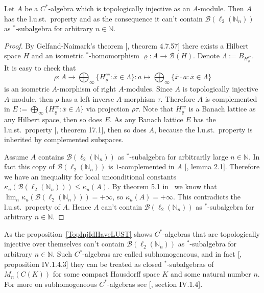 \begin{proposition}\label{TopInjIdHaveLUST} Let $A$ be a $C^*$-algebra which is
topologically injective as an $A$-module. Then $A$ has the l.u.st.\ property and
as the consequence it can't contain  $\mathcal{B}(\ell_2(\mathbb{N}_n))$ as
${}^*$-subalgebra for arbitrary $n\in\mathbb{N}$.
\end{proposition}
\begin{proof} By Gelfand-Naimark's theorem [\cite{HelBanLocConvAlg}, theorem
4.7.57] there exists a Hilbert space $H$ and an isometric ${}^*$-homomorphism
$\varrho:A\to\mathcal{B}(H)$. Denote $\Lambda:=B_{H_\varrho^{cc}}$. It is easy
to check that 
$$
\rho
:A
    \to
\bigoplus\nolimits_\infty \{H_\varrho^{cc}:\overline{x}\in \Lambda \}
:a
    \mapsto 
\bigoplus\nolimits_\infty \{\overline{x}\cdot a:\overline{x}\in \Lambda \}
$$
is an isometric $A$-morphism of right $A$-modules. Since $A$ is topologically
injective $A$-module, then $\rho$ has a left inverse $A$-morphism $\tau$.
Therefore $A$ is complemented in $E:=\bigoplus_\infty
\{H_\varrho^{cc}:\overline{x}\in \Lambda \}$ via projection $\rho\tau$. Note
that $H_{\varrho}^{cc}$ is a Banach lattice as any Hilbert space, then so does
$E$. As any Banach lattice $E$ has the l.u.st.\ property [\cite{DiestAbsSumOps},
theorem 17.1], then so does $A$, because the l.u.st.\ property is inherited by
complemented subspaces.

Assume $A$ contains $\mathcal{B}(\ell_2(\mathbb{N}_n))$ as ${}^*$-subalgebra for
arbitrarily large $n\in\mathbb{N}$. In fact this copy of
$\mathcal{B}(\ell_2(\mathbb{N}_n))$ is $1$-complemented in $A$
[\cite{LauLoyWillisAmnblOfBanAndCStarAlgsOfLCG}, lemma 2.1]. Therefore we have
an inequality for local unconditional constants
$\kappa_u(\mathcal{B}(\ell_2(\mathbb{N}_n)))\leq \kappa_u(A)$. By theorem 5.1
in~\cite{GorLewAbsSmOpAndLocUncondStrct} we know that $\lim_n
\kappa_u(\mathcal{B}(\ell_2(\mathbb{N}_n)))=+\infty$, so $\kappa_u(A)=+\infty$.
This contradicts the l.u.st.\ property of $A$. Hence $A$ can't contain
$\mathcal{B}(\ell_2(\mathbb{N}_n))$ as ${}^*$-subalgebra for arbitrary
$n\in\mathbb{N}$.
\end{proof}

As the proposition~\ref{TopInjIdHaveLUST} shows $C^*$-algebras that are
topologically injective over themselves can't contain
$\mathcal{B}(\ell_2(\mathbb{N}_n))$ as ${}^*$-subalgebra for arbitrary
$n\in\mathbb{N}$. Such $C^*$-algebras are called subhomogeneous, and in fact
[\cite{BlackadarOpAlg}, proposition IV.1.4.3] they can be treated as closed
${}^*$-subalgebras of $M_n(C(K))$ for some compact Hausdorff space $K$ and some
natural number $n$. For more on subhomogeneous $C^*$-algebras see
[\cite{BlackadarOpAlg}, section IV.1.4]. 

